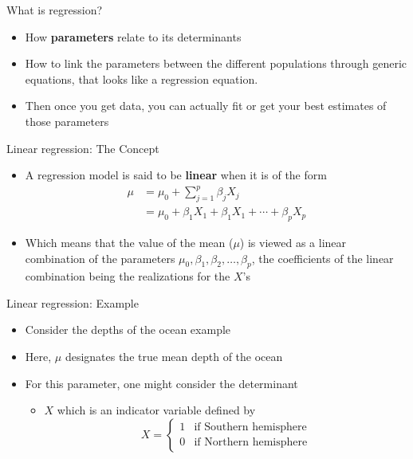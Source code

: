 \documentclass[10pt]{beamer}\usepackage[]{graphicx}\usepackage[]{color}
\begin{document}
\begin{frame}{What is regression?}
	
	\begin{itemize}
		\setlength\itemsep{2em}
		\item How \textbf{parameters} relate to its determinants 
		\item How to link the parameters between the different populations through generic equations, that looks like a regression equation.  
		\item Then once you get data, you can actually fit or get your best estimates of those parameters
	\end{itemize}
	
\end{frame}

\begin{frame}{Linear regression: The Concept}
	
	\begin{itemize}
		\setlength\itemsep{2em}
		\item A regression model is said to be \textbf{linear} when it is of the form 
		\begin{align*}
			\mu & = \mu_0 + \sum_{j=1}^p \beta_j X_j \\
			& = \mu_0 + \beta_1 X_1 +  \beta_1 X_1 + \cdots +  \beta_p X_p
		\end{align*}
		
		\item Which means that the value of the mean ($\mu$) is viewed as a linear combination of the parameters $\mu_0, \beta_1, \beta_2, \ldots, \beta_p$, the coefficients of the linear combination being the realizations for the $X$'s
		
	\end{itemize}
	
\end{frame}

\begin{frame}{Linear regression: Example}
	
	\begin{itemize}
		\setlength\itemsep{2em}
		\item Consider the depths of the ocean example
		\item Here, $\mu$ designates the true mean depth of the ocean 
		\item For this parameter, one might consider the determinant 
		\begin{itemize}
			\item $X$ which is an indicator variable defined by			
			$$
			X = \begin{cases}
			1 & \textrm{if Southern hemisphere}\\
			0 & \textrm{if Northern hemisphere}
			\end{cases}
			$$
			
		\end{itemize} 
		
	\end{itemize}
	
\end{frame}
\end{document}
